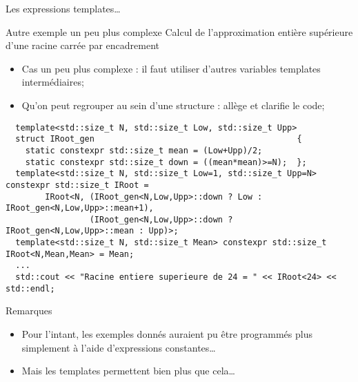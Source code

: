 \documentclass[compress,10pt,aspectratio=169]{beamer}
\begin{document}
  \begin{frame}[fragile]{Les expressions templates\ldots}
    \scriptsize
    \begin{exampleblock}{\small Autre exemple un peu plus complexe}
    Calcul de l'approximation entière supérieure d'une racine carrée par encadrement
    \begin{itemize}
    \item Cas un peu plus complexe : il faut utiliser d'autres variables templates intermédiaires;
    \item Qu'on peut regrouper au sein d'une structure : allège et clarifie le code;
    \end{itemize}
    \begin{verbatim}
  template<std::size_t N, std::size_t Low, std::size_t Upp>
  struct IRoot_gen                                         {
    static constexpr std::size_t mean = (Low+Upp)/2;
    static constexpr std::size_t down = ((mean*mean)>=N);  };
  template<std::size_t N, std::size_t Low=1, std::size_t Upp=N> constexpr std::size_t IRoot = 
        IRoot<N, (IRoot_gen<N,Low,Upp>::down ? Low : IRoot_gen<N,Low,Upp>::mean+1), 
                 (IRoot_gen<N,Low,Upp>::down ? IRoot_gen<N,Low,Upp>::mean : Upp)>;
  template<std::size_t N, std::size_t Mean> constexpr std::size_t IRoot<N,Mean,Mean> = Mean;
  ...
  std::cout << "Racine entiere superieure de 24 = " << IRoot<24> << std::endl;
  \end{verbatim}
  \end{exampleblock}
  
  \vspace*{-6mm}
  \begin{alertblock}{\small Remarques}
  \begin{itemize}
  \item Pour l'intant, les exemples donnés auraient pu être programmés plus simplement à l'aide d'expressions constantes\ldots
  \item Mais les templates permettent bien plus que cela\ldots
  \end{itemize}
  \end{alertblock}
  \end{frame}
\end{document}
